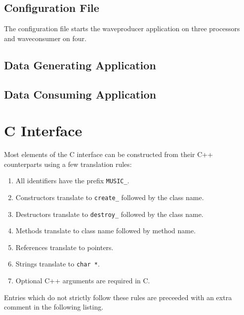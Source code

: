 \documentclass[a4paper,twoside]{report}
\begin{document}
\section{Configuration File}
\label{sec:conffile}

The configuration file starts the waveproducer application on three
processors and waveconsumer on four.




\section{Data Generating Application}




\section{Data Consuming Application}




\chapter{C Interface}
\label{app:cint}

Most elements of the C interface can be constructed from their C++
counterparts using a few translation rules:

\begin{enumerate}
\item All identifiers have the prefix \lstinline|MUSIC_|.
\item Constructors translate to \lstinline|create_| followed by the
  class name.
\item Destructors translate to \lstinline|destroy_| followed by the
  class name.
\item Methods translate to class name followed by method name.
\item References translate to pointers.
\item Strings translate to \lstinline|char *|.
\item Optional C++ arguments are required in C.
\end{enumerate}

Entries which do not strictly follow these rules are preceeded with an
extra comment in the following listing.


\end{document}
